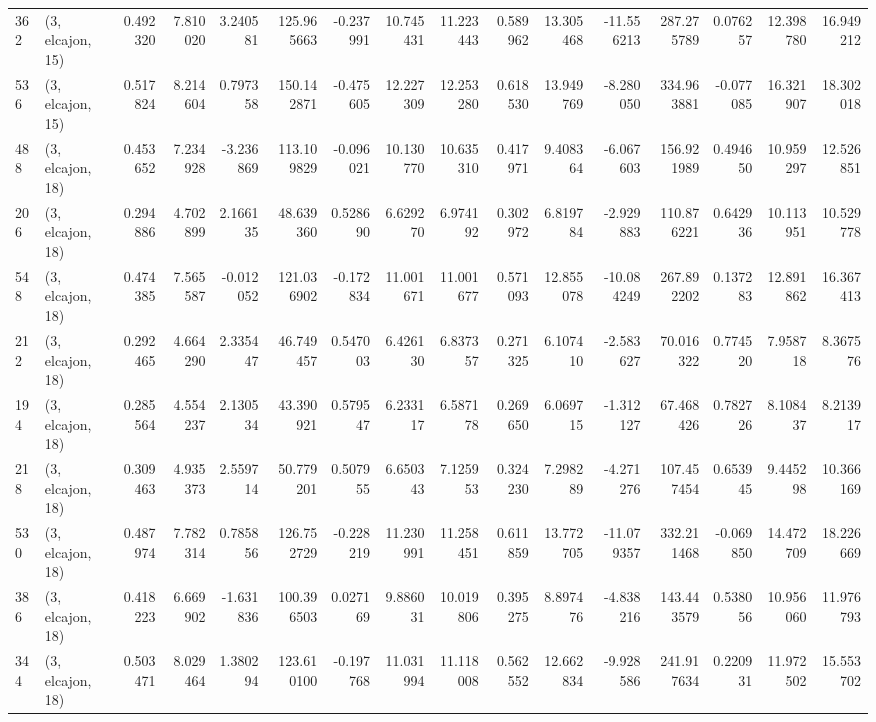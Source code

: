 \begin{tabular}{llrrrrrrrrrrrrrr}
362 &  (3, elcajon, 15) &   0.492320 &   7.810020 &   3.240581 &   125.965663 &  -0.237991 &  10.745431 &  11.223443 &  0.589962 &  13.305468 & -11.556213 &   287.275789 &  0.076257 &  12.398780 &  16.949212 \\
536 &  (3, elcajon, 15) &   0.517824 &   8.214604 &   0.797358 &   150.142871 &  -0.475605 &  12.227309 &  12.253280 &  0.618530 &  13.949769 &  -8.280050 &   334.963881 & -0.077085 &  16.321907 &  18.302018 \\
488 &  (3, elcajon, 18) &   0.453652 &   7.234928 &  -3.236869 &   113.109829 &  -0.096021 &  10.130770 &  10.635310 &  0.417971 &   9.408364 &  -6.067603 &   156.921989 &  0.494650 &  10.959297 &  12.526851 \\
206 &  (3, elcajon, 18) &   0.294886 &   4.702899 &   2.166135 &    48.639360 &   0.528690 &   6.629270 &   6.974192 &  0.302972 &   6.819784 &  -2.929883 &   110.876221 &  0.642936 &  10.113951 &  10.529778 \\
548 &  (3, elcajon, 18) &   0.474385 &   7.565587 &  -0.012052 &   121.036902 &  -0.172834 &  11.001671 &  11.001677 &  0.571093 &  12.855078 & -10.084249 &   267.892202 &  0.137283 &  12.891862 &  16.367413 \\
212 &  (3, elcajon, 18) &   0.292465 &   4.664290 &   2.335447 &    46.749457 &   0.547003 &   6.426130 &   6.837357 &  0.271325 &   6.107410 &  -2.583627 &    70.016322 &  0.774520 &   7.958718 &   8.367576 \\
194 &  (3, elcajon, 18) &   0.285564 &   4.554237 &   2.130534 &    43.390921 &   0.579547 &   6.233117 &   6.587178 &  0.269650 &   6.069715 &  -1.312127 &    67.468426 &  0.782726 &   8.108437 &   8.213917 \\
218 &  (3, elcajon, 18) &   0.309463 &   4.935373 &   2.559714 &    50.779201 &   0.507955 &   6.650343 &   7.125953 &  0.324230 &   7.298289 &  -4.271276 &   107.457454 &  0.653945 &   9.445298 &  10.366169 \\
530 &  (3, elcajon, 18) &   0.487974 &   7.782314 &   0.785856 &   126.752729 &  -0.228219 &  11.230991 &  11.258451 &  0.611859 &  13.772705 & -11.079357 &   332.211468 & -0.069850 &  14.472709 &  18.226669 \\
386 &  (3, elcajon, 18) &   0.418223 &   6.669902 &  -1.631836 &   100.396503 &   0.027169 &   9.886031 &  10.019806 &  0.395275 &   8.897476 &  -4.838216 &   143.443579 &  0.538056 &  10.956060 &  11.976793 \\
344 &  (3, elcajon, 18) &   0.503471 &   8.029464 &   1.380294 &   123.610100 &  -0.197768 &  11.031994 &  11.118008 &  0.562552 &  12.662834 &  -9.928586 &   241.917634 &  0.220931 &  11.972502 &  15.553702 \\

\end{tabular}
